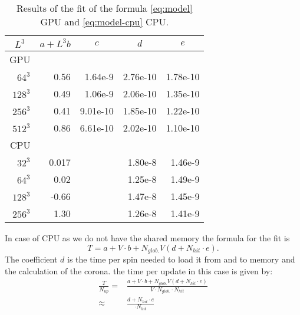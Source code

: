 \documentclass[a4paper]{llncs}
\begin{document}
\begin{table}
\begin{center}
\begin{tabular}{||r|D{.}{.}{8}|D{.}{.}{8}|D{.}{.}{8}|D{.}{.}{8}||}
\hline\hline
{} 
& 
& 
& 
&\\\hline\hline
GPU & \\\hline
$64^3$  & 0.56  & 1.64e-9       & 	2.76e-10       & 1.78e-10 \\
$128^3$ & 0.49  & 1.06e-9       &	2.06e-10       & 1.35e-10 \\
$256^3$ & 0.41  & 9.01e-10	&       1.85e-10       & 1.22e-10\\
$512^3$ & 0.86  & 6.61e-10	&       2.02e-10       & 1.10e-10\\\hline\hline
CPU & \\\hline
$32^3$  &  0.017&       & 	1.80e-8 &	1.46e-9\\
$64^3$  &  0.02 &       & 	1.25e-8 &	1.49e-9\\
$128^3$ & -0.66 &       &	1.47e-8 & 	1.45e-9\\
$256^3$ & 1.30  &       &	1.26e-8 & 1.41e-9\\\hline\hline
\end{tabular}
\end{center}
\caption{\label{tab:fit}Results of the fit of the formula \eqref{eq:model} GPU and \eqref{eq:model-cpu} CPU.}
\end{table}
In case of CPU as we do not have the shared memory the formula for the fit is
\begin{equation}\label{eq:model-cpu}
T  = a+ V \cdot b +
N_{glob.} V \left(d + N_{hit}\cdot e\right) . 
\end{equation}
The coefficient $d$ is the time per spin needed to load it from and to
memory and the calculation of the corona. the time per update  in this case is given by:
\begin{equation}\begin{split}
\frac{T}{N_{up}}=&\frac{a+ V \cdot b + N_{glob.} V \left(d + N_{hit}\cdot e\right)}{V\cdot N_{glob.}\cdot N_{hit}}\\
\approx&
\frac{d + N_{hit}\cdot e}{\cdot N_{hit}}
\end{split}
\end{equation}
\end{document}
